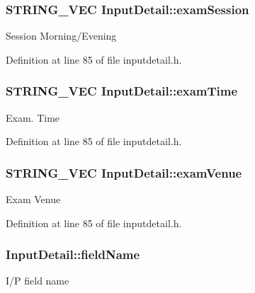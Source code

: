 \hypertarget{classInputDetail_a4501d1379c278965497abf21d369ad9e}{
\subsubsection[{exam\-Session}]{\setlength{\rightskip}{0pt plus 5cm}\-S\-T\-R\-I\-N\-G\-\_\-\-V\-E\-C {\bf \-Input\-Detail\-::exam\-Session}}}\label{classInputDetail_a4501d1379c278965497abf21d369ad9e}
\-Session \-Morning/\-Evening 

\-Definition at line 85 of file inputdetail.\-h.

\hypertarget{classInputDetail_a847dd8bb2f0c43960746cfa4d2310a15}{
\subsubsection[{exam\-Time}]{\setlength{\rightskip}{0pt plus 5cm}\-S\-T\-R\-I\-N\-G\-\_\-\-V\-E\-C {\bf \-Input\-Detail\-::exam\-Time}}}\label{classInputDetail_a847dd8bb2f0c43960746cfa4d2310a15}
\-Exam. \-Time 

\-Definition at line 85 of file inputdetail.\-h.

\hypertarget{classInputDetail_a695928668a413ac052776c0b6cb27501}{
\subsubsection[{exam\-Venue}]{\setlength{\rightskip}{0pt plus 5cm}\-S\-T\-R\-I\-N\-G\-\_\-\-V\-E\-C {\bf \-Input\-Detail\-::exam\-Venue}}}\label{classInputDetail_a695928668a413ac052776c0b6cb27501}
\-Exam \-Venue 

\-Definition at line 85 of file inputdetail.\-h.

\hypertarget{classInputDetail_ac6f85380c5152c406d483726382c4798}{
\subsubsection[{field\-Name}]{ {\bf \-Input\-Detail\-::field\-Name}}}\label{classInputDetail_ac6f85380c5152c406d483726382c4798}
\-I/\-P field name 

